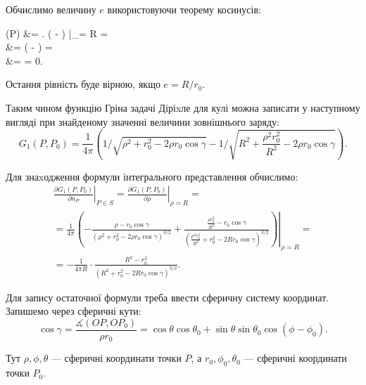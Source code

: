 Обчислимо величину $e$ використовуючи теорему косинусів:
\begin{nalign}
	\Pi(P) &=  \left. \left(  -  \right) \right|_{\rho = R} = \\
	&=   \left(  -  \right) = \\
	&=  \cdot {} = 0.
\end{nalign}

Остання рівність буде вірною, якщо $e = R / r_0$. \medskip

Таким чином функцію Гріна задачі Діріxле для кулі можна записати у наступному вигляді при знайденому значенні величини зовнішнього заряду:
\begin{equation}
	G_1 (P, P_0) = \frac{1}{4\pi} \left( 1 / \sqrt{\rho^2 + r_0^2 - 2 \rho r_0 \cos \gamma} - 1 / \sqrt{R^2 + \frac{\rho^2 r_0^2}{R^2} - 2 \rho r_0 \cos \gamma} \right).
\end{equation}

Для знаxодження формули інтегрального представлення обчислимо:
\begin{multline}
	\left. \frac{\partial G_1 (P, P_0)}{\partial n_P} \right|_{P \in S} = \left. \frac{\partial G_1 (P, P_0)}{\partial \rho} \right|_{\rho = R} = \\
	= \frac{1}{4 \pi} \left. \left( - \frac{\rho - r_0 \cos \gamma}{(\rho^2 + r_0^2 - 2 \rho r_0 \cos \gamma)^{3/2}} + \frac{\frac{\rho r_0^2}{R^2} - r_0 \cos \gamma}{\left(\frac{\rho^2 r_0^2}{R^2} + r_0^2 - 2 R r_0 \cos \gamma\right)^{3/2}} \right) \right|_{\rho = R} = \\
	= - \frac{1}{4 \pi R} \cdot \frac{R^2 - r_0^2}{(R^2 + r_0^2 - 2 R r_0 \cos \gamma)^{3/2}}.
\end{multline}

Для запису остаточної формули треба ввести сферичну систему координат. Запишемо через сферичні кути:
\begin{equation}
	\cos \gamma = \frac{\measuredangle (OP, OP_0)}{\rho r_0} = \cos \theta \cos \theta_0 + \sin \theta \sin \theta_0 \cos (\phi - \phi_0).
\end{equation}

Тут $\rho, \phi, \theta$ --- сферичні координати точки $P$, а $r_0, \phi_0, \theta_0$ --- сферичні координати точки $P_0$. \medskip

